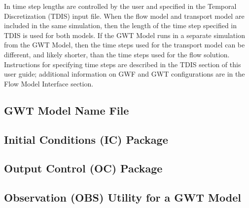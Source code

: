 In \mf time step lengths are controlled by the user and specified in the Temporal Discretization (TDIS) input file.  When the flow model and transport model are included in the same simulation, then the length of the time step specified in TDIS is used for both models.  If the GWT Model runs in a separate simulation from the GWT Model, then the time steps used for the transport model can be different, and likely shorter, than the time steps used for the flow solution.  Instructions for specifying time steps are described in the TDIS section of this user guide; additional information on GWF and GWT configurations are in the Flow Model Interface section.  



\newpage
\subsection{GWT Model Name File}


%

%

%

\newpage
\subsection{Initial Conditions (IC) Package}


\newpage
\subsection{Output Control (OC) Package}


\newpage
\subsection{Observation (OBS) Utility for a GWT Model}


